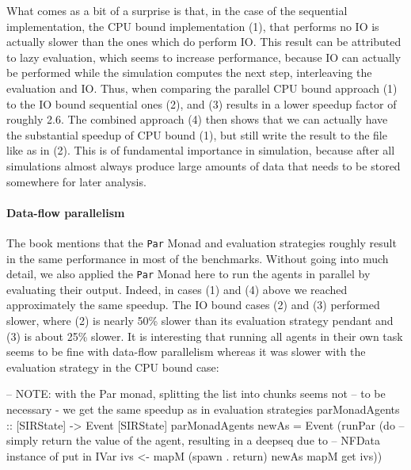 What comes as a bit of a surprise is that, in the case of the sequential implementation, the CPU bound implementation (1), that performs no IO is actually slower than the ones which do perform IO. This result can be attributed to lazy evaluation, which seems to increase performance, because IO can actually be performed while the simulation computes the next step, interleaving the evaluation and IO. Thus, when comparing the parallel CPU bound approach (1) to the IO bound sequential ones (2), and (3) results in a lower speedup factor of roughly 2.6.
The combined approach (4) then shows that we can actually have the substantial speedup of CPU bound (1), but still write the result to the file like as in (2). This is of fundamental importance in simulation, because after all simulations almost always produce large amounts of data that needs to be stored somewhere for later analysis.

\paragraph{Data-flow parallelism} The book \cite{marlow_parallel_2013} mentions that the \texttt{Par} Monad and evaluation strategies roughly result in the same performance in most of the benchmarks. Without going into much detail, we also applied the \texttt{Par} Monad here to run the agents in parallel by evaluating their output. Indeed, in cases (1) and (4) above we reached approximately the same speedup. The IO bound cases (2) and (3) performed slower, where (2) is nearly 50\% slower than its evaluation strategy pendant and (3) is about 25\% slower. It is interesting that running all agents in their own task seems to be fine with data-flow parallelism whereas it was slower with the evaluation strategy in the CPU bound case:

\begin{HaskellCode}
-- NOTE: with the Par monad, splitting the list into chunks seems not 
-- to be necessary - we get the same speedup as in evaluation strategies
parMonadAgents :: [SIRState] -> Event [SIRState]
parMonadAgents newAs = Event (runPar (do
  -- simply return the value of the agent, resulting in a deepseq due to
  -- NFData instance of put in IVar
  ivs <- mapM (spawn . return) newAs
  mapM get ivs))
\end{HaskellCode}

